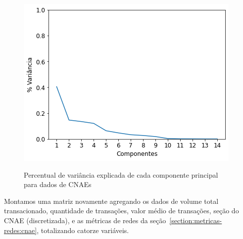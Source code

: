 \begin{figure}[htb]
	\centering
    \caption{Percentual de variância explicada de cada componente principal para dados de CNAEs}
    \includegraphics[scale=0.7]{images/base-de-dados-28.1-pca-components-monthly-cnae.png}
    \label{fig:resultados:base-de-dados-24-pca-monthly-cnae}
    \fdadospesquisa
\end{figure}

Montamos uma matriz novamente agregando os dados de volume total transacionado, quantidade de transações, valor médio de transações, seção do CNAE (discretizada), e as métricas de redes da seção~\ref{section:metricas-redes:cnae}, totalizando catorze variáveis.


